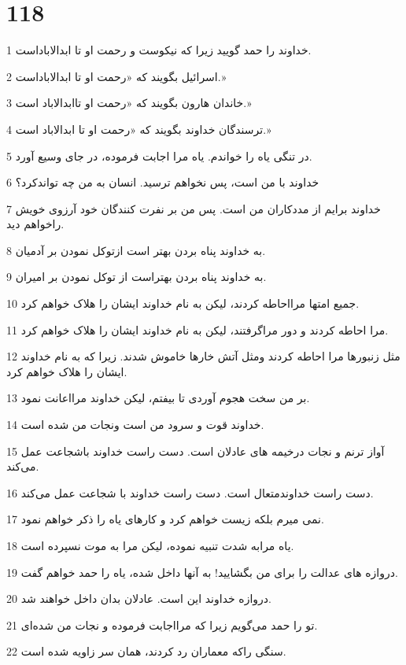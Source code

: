 \chapter{118}

\par 1 خداوند را حمد گویید زیرا که نیکوست و رحمت او تا ابدالاباداست.
\par 2 اسرائیل بگویند که «رحمت او تا ابدالاباداست.»
\par 3 خاندان هارون بگویند که «رحمت او تاابدالاباد است.»
\par 4 ترسندگان خداوند بگویند که «رحمت او تا ابدالاباد است.»
\par 5 در تنگی یاه را خواندم. یاه مرا اجابت فرموده، در جای وسیع آورد.
\par 6 خداوند با من است، پس نخواهم ترسید. انسان به من چه تواندکرد؟
\par 7 خداوند برایم از مددکاران من است. پس من بر نفرت کنندگان خود آرزوی خویش راخواهم دید.
\par 8 به خداوند پناه بردن بهتر است ازتوکل نمودن بر آدمیان.
\par 9 به خداوند پناه بردن بهتراست از توکل نمودن بر امیران.
\par 10 جمیع امتها مرااحاطه کردند، لیکن به نام خداوند ایشان را هلاک خواهم کرد.
\par 11 مرا احاطه کردند و دور مراگرفتند، لیکن به نام خداوند ایشان را هلاک خواهم کرد.
\par 12 مثل زنبورها مرا احاطه کردند ومثل آتش خارها خاموش شدند. زیرا که به نام خداوند ایشان را هلاک خواهم کرد.
\par 13 بر من سخت هجوم آوردی تا بیفتم، لیکن خداوند مرااعانت نمود.
\par 14 خداوند قوت و سرود من است ونجات من شده است.
\par 15 آواز ترنم و نجات درخیمه های عادلان است. دست راست خداوند باشجاعت عمل می‌کند.
\par 16 دست راست خداوندمتعال است. دست راست خداوند با شجاعت عمل می‌کند.
\par 17 نمی میرم بلکه زیست خواهم کرد و کارهای یاه را ذکر خواهم نمود.
\par 18 یاه مرابه شدت تنبیه نموده، لیکن مرا به موت نسپرده است.
\par 19 دروازه های عدالت را برای من بگشایید! به آنها داخل شده، یاه را حمد خواهم گفت.
\par 20 دروازه خداوند این است. عادلان بدان داخل خواهند شد.
\par 21 تو را حمد می‌گویم زیرا که مرااجابت فرموده و نجات من شده‌ای.
\par 22 سنگی راکه معماران رد کردند، همان سر زاویه شده است.
